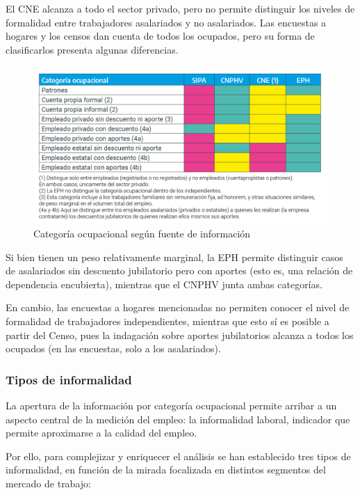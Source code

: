 \documentclass[
  openany]{book}
\begin{document}
El CNE alcanza a todo el sector privado, pero no permite distinguir los niveles de formalidad entre trabajadores asalariados y no asalariados.
Las encuestas a hogares y los censos dan cuenta de todos los ocupados, pero su forma de clasificarlos presenta algunas diferencias.

\begin{figure}

{\centering \includegraphics[width=1\linewidth]{imagenes/figura3.3} 

}

\caption{Categoría ocupacional según fuente de información}\label{fig:empleofuentes3}
\end{figure}

Si bien tienen un peso relativamente marginal, la EPH permite distinguir casos de asalariados sin descuento jubilatorio pero con aportes (esto es, una relación de dependencia encubierta), mientras que el CNPHV junta ambas categorías.

En cambio, las encuestas a hogares mencionadas no permiten conocer el nivel de formalidad de trabajadores independientes, mientras que esto sí es posible a partir del Censo, pues la indagación sobre aportes jubilatorios alcanza a todos los ocupados (en las encuestas, solo a los asalariados).

\hypertarget{tipos-de-informalidad}{%
\subsubsection{Tipos de informalidad}\label{tipos-de-informalidad}}

La apertura de la información por categoría ocupacional permite arribar a un aspecto central de la medición del empleo: la informalidad laboral, indicador que permite aproximarse a la calidad del empleo.

Por ello, para complejizar y enriquecer el análisis se han establecido tres tipos de informalidad, en función de la mirada focalizada en distintos segmentos del mercado de trabajo:
\end{document}
